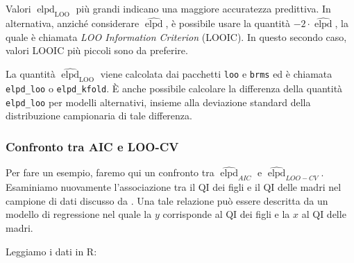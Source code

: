 \documentclass[
  10pt,
  italian,
  a4paper,
  extrafontsizes,onecolumn,openright
  ]{memoir}
\newenvironment{Shaded}{\begin{snugshade}}{\end{snugshade}}
\newcommand{\CommentTok}[1]{\textcolor[rgb]{0.56,0.35,0.01}{\textit{#1}}}
\newcommand{\DecValTok}[1]{\textcolor[rgb]{0.00,0.00,0.81}{#1}}
\newcommand{\FunctionTok}[1]{\textcolor[rgb]{0.00,0.00,0.00}{#1}}
\newcommand{\NormalTok}[1]{#1}
\newcommand{\OtherTok}[1]{\textcolor[rgb]{0.56,0.35,0.01}{#1}}
\newcommand{\SpecialCharTok}[1]{\textcolor[rgb]{0.00,0.00,0.00}{#1}}
\newcommand{\StringTok}[1]{\textcolor[rgb]{0.31,0.60,0.02}{#1}}
\DeclareMathOperator{\elpd}{elpd} %
\DeclareMathOperator{\LOO}{LOO} %
\newcommand{\R}{\textsf{R}} %
\theoremstyle{definition}
\theoremstyle{definition}
\theoremstyle{definition}
\theoremstyle{definition}
\theoremstyle{remark}
\begin{document}
Valori \(\widehat{\elpd}_{\LOO}\) più grandi indicano una maggiore accuratezza predittiva. In alternativa, anziché considerare \(\widehat{\elpd}\), è possibile usare la quantità \(-2 \cdot \widehat{\elpd}\),
la quale è chiamata \emph{LOO Information Criterion} (LOOIC). In questo secondo caso, valori LOOIC più piccoli sono da preferire.

La quantità \(\widehat{\elpd}_{\LOO}\) viene calcolata dai pacchetti \texttt{loo} e \texttt{brms} ed è chiamata \texttt{elpd\_loo} o \texttt{elpd\_kfold}. È anche possibile calcolare la differenza della quantità \texttt{elpd\_loo} per modelli alternativi, insieme alla deviazione standard della distribuzione campionaria di tale differenza.

\hypertarget{confronto-tra-aic-e-loo-cv}{%
\subsubsection{Confronto tra AIC e LOO-CV}\label{confronto-tra-aic-e-loo-cv}}

Per fare un esempio, faremo qui un confronto tra \(\widehat{\elpd}_{AIC}\) e \(\widehat{\elpd}_{LOO-CV}\). Esaminiamo nuovamente l'associazione tra il QI dei figli e il QI delle madri nel campione di dati discusso da \textcite{gelman2020regression}. Una tale relazione può essere descritta da un modello di regressione nel quale la \(y\) corrisponde al QI dei figli e la \(x\) al QI delle madri.

Leggiamo i dati in \R:

\begin{Shaded}
\end{Shaded}
\end{document}
